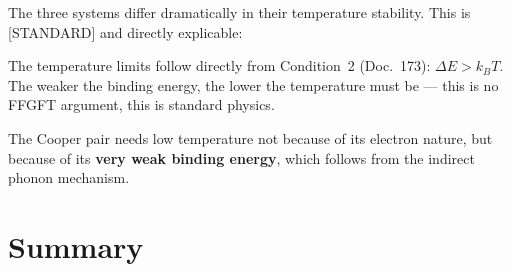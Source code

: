 The three systems differ dramatically in their
temperature stability. This is [STANDARD] and directly explicable:

\begin{center}
\end{center}

\begin{keypoint}
The temperature limits follow directly from Condition~2
(Doc.~173): $\Delta E > k_BT$.
The weaker the binding energy, the lower
the temperature must be --- this is no FFGFT argument,
this is standard physics.

The Cooper pair needs low temperature not because of
its electron nature, but because of its
\textbf{very weak binding energy},
which follows from the indirect phonon mechanism.
\end{keypoint}

\section{Summary}
\label{sec:summary-179}


